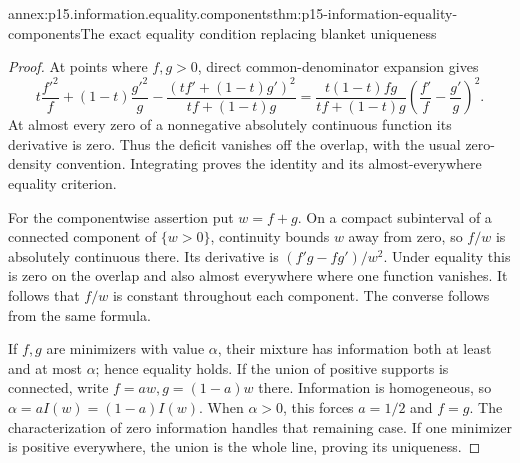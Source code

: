 \begin{annexitem}{annex:p15.information.equality.components}{thm:p15-information-equality-components}{The exact equality condition replacing blanket uniqueness}
\begin{proof}
At points where \(f,g>0\), direct common-denominator expansion gives
\[
 t\frac{f'^2}{f}+(1-t)\frac{g'^2}{g}
 -\frac{(tf'+(1-t)g')^2}{tf+(1-t)g}
 =\frac{t(1-t)fg}{tf+(1-t)g}
       \left(\frac{f'}f-\frac{g'}g\right)^2 .
\]
At almost every zero of a nonnegative absolutely continuous function
its derivative is zero. Thus the deficit vanishes off the overlap,
with the usual zero-density convention. Integrating proves the identity
and its almost-everywhere equality criterion.

For the componentwise assertion put \(w=f+g\).
On a compact subinterval of a connected component of \(\{w>0\}\),
continuity bounds \(w\) away from zero, so \(f/w\) is absolutely
continuous there. Its derivative is
\((f'g-fg')/w^2\). Under equality this is zero on the overlap and
also almost everywhere where one function vanishes.
It follows that \(f/w\) is constant throughout each component.
The converse follows from the same formula.

If \(f,g\) are minimizers with value \(\alpha\), their mixture has
information both at least and at most \(\alpha\); hence equality holds.
If the union of positive supports is connected, write
\(f=a w,g=(1-a)w\) there. Information is homogeneous, so
\(\alpha=aI(w)=(1-a)I(w)\). When \(\alpha>0\), this forces
\(a=1/2\) and \(f=g\). The characterization of zero information
handles that remaining case. If one minimizer is positive everywhere,
the union is the whole line, proving its uniqueness.
\end{proof}
\end{annexitem}

